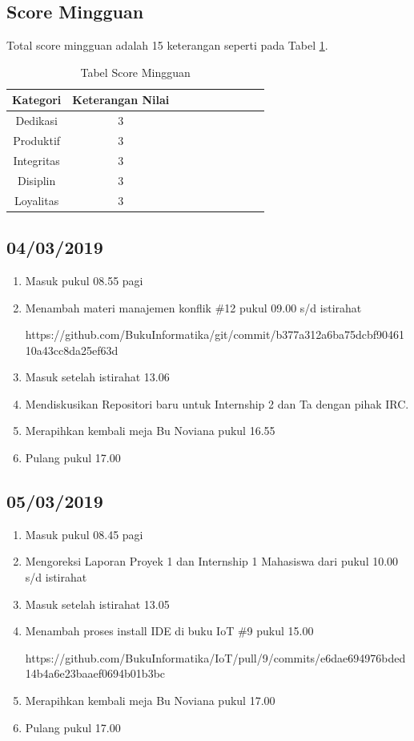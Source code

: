 \subsection{Score Mingguan}
Total score mingguan adalah 15 keterangan seperti pada Tabel \ref{table:scoremingguan}.
\begin{table}[!ht]
\centering
\begin{tabular}{ |c|c|c|c|c|c|c|c|c|c| }
\hline
Kategori & Keterangan Nilai \\
\hline
Dedikasi & 3 \\
\hline
Produktif & 3 \\
\hline
Integritas & 3 \\
\hline
Disiplin & 3 \\
\hline
Loyalitas & 3 \\
\hline
\end{tabular}
\caption{Tabel Score Mingguan}
\label{table:scoremingguan}
\end{table}

\subsection{04/03/2019}
\begin{enumerate}
  \item Masuk pukul 08.55 pagi
  \item Menambah materi manajemen konflik \#12 pukul 09.00 s/d istirahat
  \par https://github.com/BukuInformatika/git/commit/b377a312a6ba75dcbf9046110a43cc8da25ef63d
  \item Masuk setelah istirahat 13.06
  \item Mendiskusikan Repositori baru untuk Internship 2 dan Ta dengan pihak IRC.
  \item Merapihkan kembali meja Bu Noviana pukul 16.55
  \item Pulang pukul 17.00
\end{enumerate}

\subsection{05/03/2019}
\begin{enumerate}
  \item Masuk pukul 08.45 pagi
  \item Mengoreksi Laporan Proyek 1 dan Internship 1 Mahasiswa dari pukul 10.00 s/d istirahat
  \item Masuk setelah istirahat 13.05
  \item Menambah proses install IDE di buku IoT \#9 pukul 15.00
  \par https://github.com/BukuInformatika/IoT/pull/9/commits/e6dae694976bded14b4a6e23baaef0694b01b3bc
  \item Merapihkan kembali meja Bu Noviana pukul 17.00
  \item Pulang pukul 17.00
\end{enumerate}

